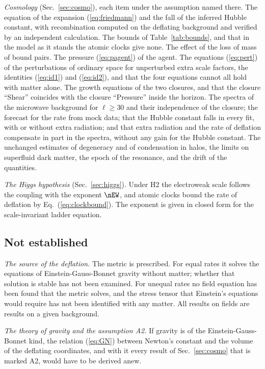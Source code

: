 \emph{Cosmology} (Sec.~\ref{sec:cosmo}), each item under the assumption named there. The equation of
the expansion (\ref{eq:friedmann}) and the fall of the inferred Hubble constant, with recombination
computed on the deflating background and verified by an independent calculation. The bounds of
Table~\ref{tab:bounds}, and that in the model as it stands the atomic clocks give none. The effect
of the loss of mass of bound pairs. The pressure (\ref{eq:pagent}) of the agent. The equations
(\ref{eq:pert}) of the perturbations of ordinary space for unperturbed extra scale factors, the
identities (\ref{eq:id1}) and (\ref{eq:id2}), and that the four equations cannot all hold with matter
alone. The growth equations of the two closures, and that the closure ``Shear'' coincides with the
closure ``Pressure'' inside the horizon. The spectra of the microwave background for $\ell\ge30$ and
their independence of the closure; the forecast for the rate from mock data; that the Hubble
constant falls in every fit, with or without extra radiation; and that extra radiation and the rate
of deflation compensate in part in the spectra, without any gain for the Hubble constant. The
unchanged estimates of degeneracy
and of condensation in halos, the limits on superfluid dark matter, the epoch of the resonance, and
the drift of the quantities.

\emph{The Higgs hypothesis} (Sec.~\ref{sec:higgs}). Under H2 the electroweak scale follows the
coupling with the exponent $\nEW$, and atomic clocks bound the rate of deflation by
Eq.~(\ref{eq:clockbound}). The exponent is given in closed form for the scale-invariant ladder
equation.

\subsection{Not established}

\emph{The source of the deflation.} The metric is prescribed. For equal rates it solves the
equations of Einstein-Gauss-Bonnet gravity without matter; whether that solution is stable has not
been examined. For unequal rates no field equation has been found that the metric solves, and the
stress tensor that Einstein's equations would require has not been identified with any matter. All
results on fields are results on a given background.

\emph{The theory of gravity and the assumption A2.} If gravity is of the Einstein-Gauss-Bonnet kind,
the relation (\ref{eq:GN}) between Newton's constant and the volume of the deflating coordinates,
and with it every result of Sec.~\ref{sec:cosmo} that is marked A2, would have to be derived anew.

